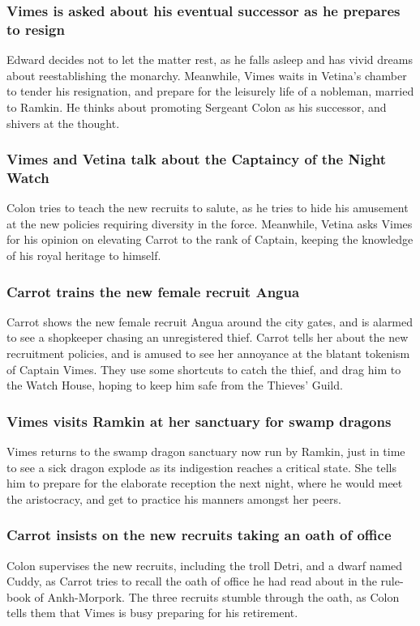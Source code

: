\subsubsection{\Gls{Vimes} is asked about his eventual successor as he prepares to resign}
\Gls{Edward} decides not to let the matter rest, as he falls asleep and has vivid dreams about
reestablishing the monarchy. Meanwhile, \Gls{Vimes} waits in \Gls{Vetina}'s chamber to tender his
resignation, and prepare for the leisurely life of a nobleman, married to \Gls{Ramkin}. He thinks
about promoting Sergeant \Gls{Colon} as his successor, and shivers at the thought.

\subsubsection{\Gls{Vimes} and \Gls{Vetina} talk about the Captaincy of the Night Watch}
\Gls{Colon} tries to teach the new recruits to salute, as he tries to hide his amusement at the
new policies requiring diversity in the force. Meanwhile, \Gls{Vetina} asks \Gls{Vimes} for his
opinion on elevating \Gls{Carrot} to the rank of Captain, keeping the knowledge of his royal
heritage to himself.

\subsubsection{\Gls{Carrot} trains the new female recruit \Gls{Angua}}
\Gls{Carrot} shows the new female recruit \Gls{Angua} around the city gates, and is alarmed to see
a shopkeeper chasing an unregistered thief. \Gls{Carrot} tells her about the new recruitment
policies, and is amused to see her annoyance at the blatant tokenism of Captain \Gls{Vimes}. They
use some shortcuts to catch the thief, and drag him to the Watch House, hoping to keep him safe from
the Thieves' Guild.

\subsubsection{\Gls{Vimes} visits \Gls{Ramkin} at her sanctuary for swamp dragons}
\Gls{Vimes} returns to the swamp dragon sanctuary now run by \Gls{Ramkin}, just in time to see a
sick dragon explode as its indigestion reaches a critical state. She tells him to prepare for the
elaborate reception the next night, where he would meet the aristocracy, and get to practice his
manners amongst her peers.

\subsubsection{\Gls{Carrot} insists on the new recruits taking an oath of office}
\Gls{Colon} supervises the new recruits, including the troll \Gls{Detri}, and a dwarf named
\Gls{Cuddy}, as \Gls{Carrot} tries to recall the oath of office he had read about in the rule-book
of Ankh-Morpork. The three recruits stumble through the oath, as \Gls{Colon} tells them that
\Gls{Vimes} is busy preparing for his retirement.

